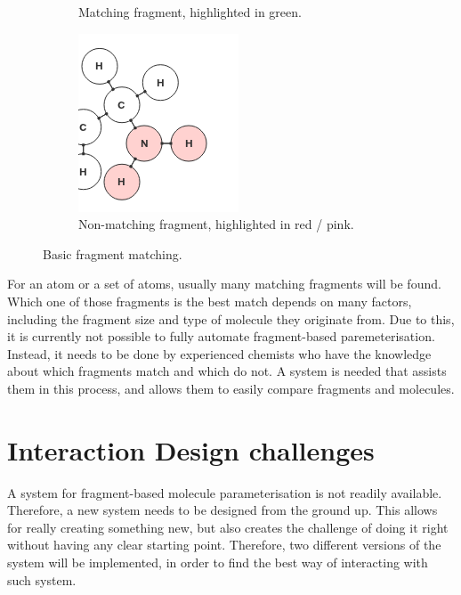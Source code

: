 \begin{figure}[h!]
\begin{subfigure}[t]{0.29\textwidth}
\caption{Matching fragment, highlighted in green.}
\end{subfigure}%
\qquad
\begin{subfigure}[t]{0.29\textwidth}
\centering
\includegraphics[width=\textwidth]{img/match_3.png}
\caption{Non-matching fragment, highlighted in red / pink.}
\end{subfigure}
\caption{Basic fragment matching.}
\end{figure}

For an atom or a set of atoms, usually many matching fragments will be found. Which one of those fragments is the best match depends on many factors, including the fragment size and type of molecule they originate from. Due to this, it is currently not possible to fully automate fragment-based paremeterisation. Instead, it needs to be done by experienced chemists who have the knowledge about which fragments match and which do not. A system is needed that assists them in this process, and allows them to easily compare fragments and molecules.


\section{Interaction Design challenges}
A system for fragment-based molecule parameterisation is not readily available. Therefore, a new system needs to be designed from the ground up. This allows for really creating something new, but also creates the challenge of doing it right without having any clear starting point. Therefore, two different versions of the system will be implemented, in order to find the best way of interacting with such system.


